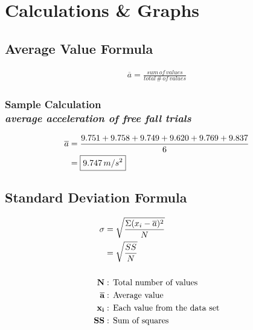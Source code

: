 \documentclass[a4paper,12pt]{article}
\begin{document}




\section{Calculations \& Graphs}

\vspace{-0.5cm}
\singlespacing


\subsection{Average Value Formula} 

\begin{align*}
		\overline{a} = \frac{sum\,of\,values}{total\, \#\,of\,values} 
\end{align*}

\subsubsection{Sample Calculation \\ {\normalfont \small\textit{average acceleration of free fall trials}}}

\begin{align*}
	\overline{a} & = \frac{9.751 + 9.758 + 9.749 + 9.620 + 9.769 + 9.837}{6} \\
							 &= \boxed{9.747\thinspace m/s^2}
\end{align*}


\subsection{Standard Deviation Formula}

\begin{align*}
		\sigma &= \sqrt{\frac{\Sigma(x_i -\overline{a})^2}{N}} \\
		 &= \sqrt{\frac{SS}{N}} \\ \\
		\textbf{N} &:\, \text{Total number of values} \\
		\overline{\textbf{a}} &:\, \text{Average value} \\
		\textbf{x\textsubscript{i}} &:\, \text{Each value from the data set} \\
		\textbf{SS} &:\, \text{Sum of squares} 
\end{align*}
\end{document}
